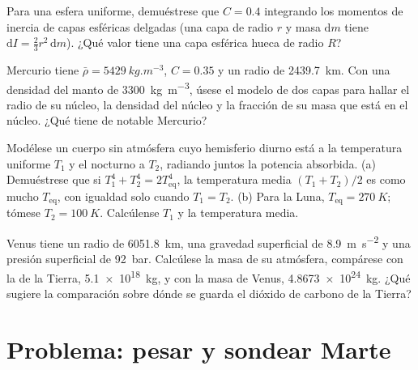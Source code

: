 \begin{exercise}[$\star\star$]\label{exo:b1:comparative-planetology:9}
Para una esfera uniforme, demuéstrese que $C = 0.4$ integrando los momentos de inercia de
capas esféricas delgadas (una capa de radio $r$ y masa $\mathrm dm$ tiene
$\mathrm dI = \tfrac23 r^2\,\mathrm dm$). ¿Qué valor tiene una capa esférica hueca de radio $R$?
\end{exercise}

\begin{exercise}[$\star\star\star$]\label{exo:b1:comparative-planetology:10}
Mercurio tiene $\bar\rho = \qty{5429}{kg.m^{-3}}$, $C = 0.35$ y un radio de \qty{2439.7}{km}.
Con una densidad del manto de \qty{3300}{kg.m^{-3}}, úsese el modelo de dos capas para hallar el
radio de su núcleo, la densidad del núcleo y la fracción de su masa que está en el núcleo.
¿Qué tiene de notable Mercurio?
\end{exercise}

\begin{exercise}[$\star\star\star$]\label{exo:b1:comparative-planetology:11}
Modélese un cuerpo sin atmósfera cuyo hemisferio diurno está a la temperatura uniforme $T_1$ y
el nocturno a $T_2$, radiando juntos la potencia absorbida. (a) Demuéstrese que si
$T_1^4 + T_2^4 = 2T_\mathrm{eq}^4$, la temperatura media $(T_1 + T_2)/2$ es como mucho
$T_\mathrm{eq}$, con igualdad solo cuando $T_1 = T_2$. (b) Para la Luna, $T_\mathrm{eq} = \qty{270}{K}$; tómese $T_2 = \qty{100}{K}$. Calcúlense $T_1$ y la temperatura media.
\end{exercise}

\begin{exercise}[$\star\star\star$]\label{exo:b1:comparative-planetology:12}
Venus tiene un radio de \qty{6051.8}{km}, una gravedad superficial de \qty{8.9}{m.s^{-2}} y una
presión superficial de \qty{92}{bar}. Calcúlese la masa de su atmósfera, compárese con la de la
Tierra, \qty{5.1e18}{kg}, y con la masa de Venus, \qty{4.8673e24}{kg}. ¿Qué sugiere la
comparación sobre dónde se guarda el dióxido de carbono de la Tierra?
\end{exercise}

\section{Problema: pesar y sondear Marte}

